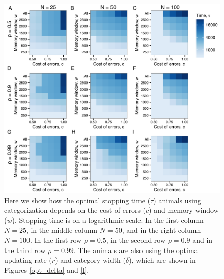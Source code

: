 \begin{figure}
\includegraphics[width=6.85in]{figures/time_heat_maps.pdf}
\caption{\sffamily\small\textbf{} Here we show how the optimal stopping time ($\tau$) animals using categorization depends on the cost of errors ($c$) and memory window ($w$). Stopping time is on a logarithmic scale. In the first column $N=25$, in the middle column $N=50$, and in the right column $N=100$. In the first row $\rho=0.5$, in the second row $\rho=0.9$ and in the third row $\rho=0.99$. The animals are also using the optimal updating rate ($r$) and category width ($\delta$), which are shown in Figures \ref{opt_delta} and \ref{l}.}
\label{time}
\end{figure}


